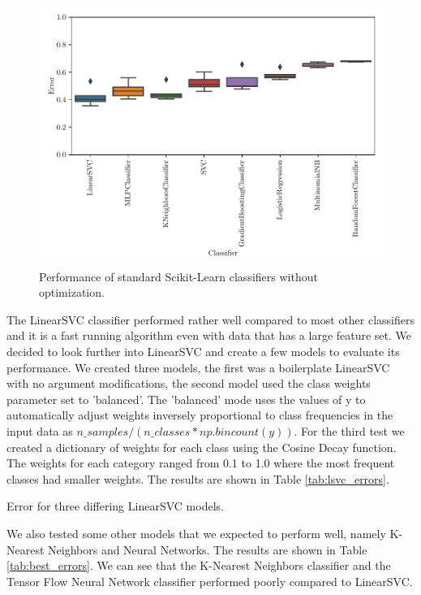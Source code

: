 \begin{figure}[ht]
  \centering
  \includegraphics[width=\textwidth]{../img/plot_explore_classifiers.pdf}
  \caption{Performance of standard Scikit-Learn classifiers without optimization.}
  \label{fig:explore_classifiers}
\end{figure}

The LinearSVC classifier performed rather well compared to most other classifiers and it is a fast running algorithm even with data that has a large feature set. We decided to look further into LinearSVC and create a few models to evaluate its performance. We created three models, the first was a boilerplate LinearSVC with no argument modifications, the second model used the class weights parameter set to 'balanced'. The 'balanced' mode uses the values of y to automatically adjust weights inversely proportional to class frequencies in the input data as $n\_samples / (n\_classes * np.bincount(y))$. For the third test we created a dictionary of weights for each class using the Cosine Decay function. The weights for each category ranged from 0.1 to 1.0 where the most frequent classes had smaller weights. The results are shown in Table \ref{tab:lsvc_errors}.


\begin{table}[!ht]
\centering
\caption{Error for three differing LinearSVC models.}

\label{tab:lsvc_errors}
\end{table}

We also tested some other models that we expected to perform well, namely K-Nearest Neighbors and Neural Networks. The results are shown in Table \ref{tab:best_errors}. We can see that the K-Nearest Neighbors classifier and the Tensor Flow Neural Network classifier performed poorly compared to LinearSVC.

